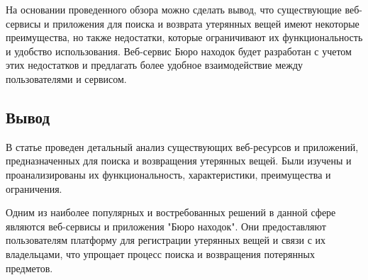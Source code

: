 \documentclass{mirea-article}
\begin{document}
\begin{multicols}{2}
		На основании проведенного обзора можно сделать вывод, что существующие веб-сервисы и приложения для поиска и возврата утерянных вещей имеют некоторые преимущества, но также недостатки, которые ограничивают их функциональность и удобство использования. Веб-сервис Бюро находок будет разработан с учетом этих недостатков и предлагать более удобное взаимодействие между пользователями и сервисом.
		
		\subsection*{Вывод}
		
		В статье проведен детальный анализ существующих веб-ресурсов и приложений, предназначенных для поиска и возвращения утерянных вещей. Были изучены и проанализированы их функциональность, характеристики, преимущества и ограничения.
		
		Одним из наиболее популярных и востребованных решений в данной сфере являются веб-сервисы и приложения "Бюро находок". Они предоставляют пользователям платформу для регистрации утерянных вещей и связи с их владельцами, что упрощает процесс поиска и возвращения потерянных предметов.
	\end{multicols}
	
\end{document}
